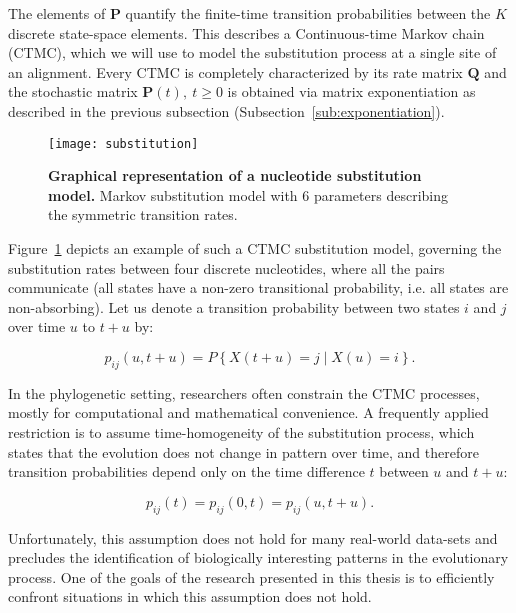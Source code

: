 The elements of $\mathbf{P}$ quantify the finite-time transition probabilities between the $K$ discrete state-space elements.
This describes a Continuous-time Markov chain (CTMC), which  we will use to model the substitution process at a single site of an alignment.
Every CTMC is completely characterized by its rate matrix $\mathbf{Q}$ and the stochastic matrix $\mathbf{P}(t),\ t\geq0$ is obtained via matrix exponentiation as described in the previous subsection (Subsection~\ref{sub:exponentiation}).

\begin{figure}[h!]
\centering
\texttt{[image: substitution]} 
\caption{
{ \footnotesize 
{\bf  Graphical representation of a nucleotide substitution model.} 
Markov substitution model with 6 parameters describing the symmetric transition rates.
} %
}
\label{fig:substitution}
\end{figure}

Figure~\ref{fig:substitution} depicts an example of such a CTMC substitution model, governing the substitution rates between four discrete nucleotides, where all the pairs communicate (all states have a non-zero transitional probability, i.e. all states are non-absorbing).
Let us denote a transition probability between two states $i$ and $j$ over time $u$ to $t+u$ by:

\begin{equation}
p_{ij}\left(u,t+u\right)=P\left\{ X(t+u)=j\mid X(u)=i\right\} .
\end{equation}

In the phylogenetic setting, researchers often constrain the CTMC processes, mostly for computational and mathematical convenience.
A frequently applied restriction is to assume time-homogeneity of the substitution process, which states that the evolution does not change in pattern over time, and therefore transition probabilities depend only on the time difference $t$ between $u$ and $t + u$:

\begin{equation}
p_{ij}\left(t\right) = p_{ij}\left(0,t\right) = p_{ij}\left(u,t+u\right).
\label{eq:time_homogeneity}
\end{equation}

Unfortunately, this assumption does not hold for many real-world data-sets and precludes the identification of biologically interesting patterns in the evolutionary process. %
One of the goals of the research presented in this thesis is to efficiently confront situations in which this assumption does not hold.

